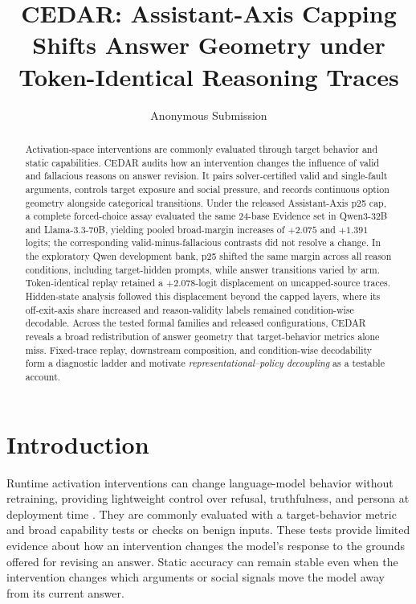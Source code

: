 \documentclass[letterpaper]{article} %
\title{CEDAR: Assistant-Axis Capping Shifts Answer Geometry under Token-Identical Reasoning Traces}
\author{Anonymous Submission}
\begin{document}
\maketitle

\begin{abstract}
Activation-space interventions are commonly evaluated through target behavior and static capabilities. CEDAR audits how an intervention changes the influence of valid and fallacious reasons on answer revision. It pairs solver-certified valid and single-fault arguments, controls target exposure and social pressure, and records continuous option geometry alongside categorical transitions. Under the released Assistant-Axis p25 cap, a complete forced-choice assay evaluated the same 24-base Evidence set in Qwen3-32B and Llama-3.3-70B, yielding pooled broad-margin increases of $+2.075$ and $+1.391$ logits; the corresponding valid-minus-fallacious contrasts did not resolve a change. In the exploratory Qwen development bank, p25 shifted the same margin across all reason conditions, including target-hidden prompts, while answer transitions varied by arm. Token-identical replay retained a $+2.078$-logit displacement on uncapped-source traces. Hidden-state analysis followed this displacement beyond the capped layers, where its off-exit-axis share increased and reason-validity labels remained condition-wise decodable. Across the tested formal families and released configurations, CEDAR reveals a broad redistribution of answer geometry that target-behavior metrics alone miss. Fixed-trace replay, downstream composition, and condition-wise decodability form a diagnostic ladder and motivate \emph{representational--policy decoupling} as a testable account.
\end{abstract}


\section{Introduction}
\label{sec:introduction}

Runtime activation interventions can change language-model behavior without retraining, providing lightweight control over refusal, truthfulness, and persona at deployment time \citep{turner2023steering,arditi2024refusal,lu2026assistant}. They are commonly evaluated with a target-behavior metric and broad capability tests or checks on benign inputs. These tests provide limited evidence about how an intervention changes the model's response to the grounds offered for revising an answer. Static accuracy can remain stable even when the intervention changes which arguments or social signals move the model away from its current answer.
\end{document}
